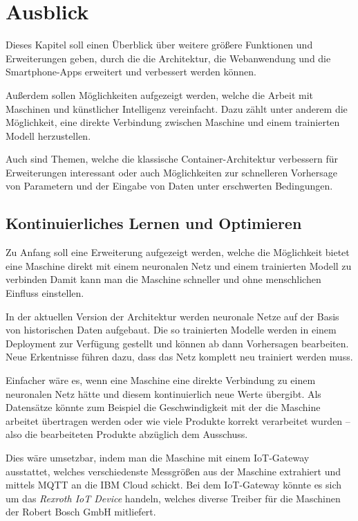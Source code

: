 \chapter{Ausblick}
\label{ch:ausblick}
Dieses Kapitel soll einen Überblick über weitere größere Funktionen und Erweiterungen geben, durch die die Architektur,
die Webanwendung und die Smartphone-Apps erweitert und verbessert werden können.

Außerdem sollen Möglichkeiten aufgezeigt werden, welche die Arbeit mit Maschinen und künstlicher Intelligenz
vereinfacht. Dazu zählt unter anderem die Möglichkeit, eine direkte Verbindung zwischen Maschine und einem trainierten
Modell herzustellen.

Auch sind Themen, welche die klassische Container-Architektur verbessern für Erweiterungen interessant oder
auch Möglichkeiten zur schnelleren Vorhersage von Parametern und der Eingabe von Daten unter erschwerten Bedingungen.

\section{Kontinuierliches Lernen und Optimieren}
Zu Anfang soll eine Erweiterung aufgezeigt werden, welche die Möglichkeit bietet eine Maschine direkt mit einem
neuronalen Netz und einem trainierten Modell zu verbinden Damit kann man die Maschine schneller und ohne menschlichen
Einfluss einstellen.

In der aktuellen Version der Architektur werden neuronale Netze auf der Basis von historischen Daten aufgebaut. Die so
trainierten Modelle werden in einem Deployment zur Verfügung gestellt und können ab dann Vorhersagen bearbeiten. Neue
Erkentnisse führen dazu, dass das Netz komplett neu trainiert werden muss.

Einfacher wäre es, wenn eine Maschine eine direkte Verbindung zu einem neuronalen Netz hätte und diesem kontinuierlich
neue Werte übergibt. Als Datensätze könnte zum Beispiel die Geschwindigkeit mit der die Maschine arbeitet übertragen
werden oder wie viele Produkte korrekt verarbeitet wurden -- also die bearbeiteten Produkte abzüglich dem Ausschuss.

Dies wäre umsetzbar, indem man die Maschine mit einem IoT-Gateway ausstattet, welches verschiedenste Messgrößen aus der
Maschine extrahiert und mittels MQTT an die IBM Cloud schickt. Bei dem IoT-Gateway könnte es sich um das
\textit{Rexroth IoT Device} handeln, welches diverse Treiber für die Maschinen der Robert Bosch GmbH mitliefert.

